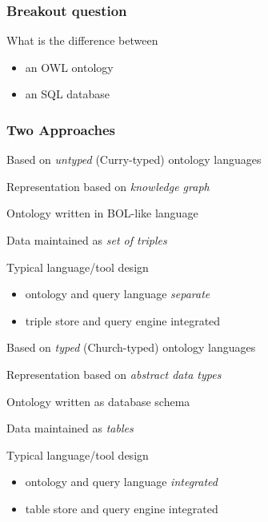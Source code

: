 \begin{frame}\frametitle{Breakout question}
What is the difference between
\begin{itemize}
\item an OWL ontology
\item an SQL database
\end{itemize}
\end{frame}

\begin{frame}\frametitle{Two Approaches}
\begin{blockitems}{Based on \emph{untyped} (Curry-typed) ontology languages}
\item Representation based on \emph{knowledge graph}
\item Ontology written in BOL-like language
\item Data maintained as \emph{set of triples}
\item Typical language/tool design
 \begin{itemize}
 \item ontology and query language \emph{separate}
 \item triple store and query engine integrated
 \end{itemize}
\end{blockitems}

\begin{blockitems}{Based on \emph{typed} (Church-typed) ontology languages}
\item Representation based on \emph{abstract data types}
\item Ontology written as database schema
\item Data maintained as \emph{tables}
\item Typical language/tool design
 \begin{itemize}
 \item ontology and query language \emph{integrated}
 \item table store and query engine integrated
 \end{itemize}
\end{blockitems}
\end{frame}

